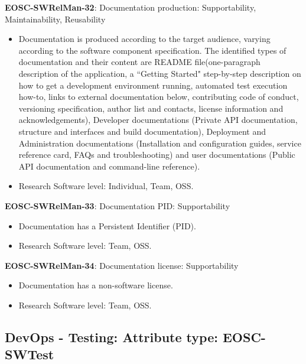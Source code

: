 \textbf{EOSC-SWRelMan-32}: Documentation production: Supportability, Maintainability, Reusability

\begin{itemize}
    \item Documentation is produced according to the target audience, varying according to the software component specification. The identified types of documentation and their content are README file(one-paragraph description of the application, a ``Getting Started" step-by-step description on how to get a development environment running, automated test execution how-to, links to external documentation below, contributing code of conduct, versioning specification, author list and contacts, license information and acknowledgements), Developer documentations (Private API documentation, structure and interfaces and build documentation), Deployment and Administration documentations (Installation and configuration guides, service reference card, FAQs and troubleshooting) and user documentations (Public API documentation and command-line reference).~\cite{aberdour_achieving_2007,shepherdson_cessda_2019,orviz_set_2017,orviz_fernandez_eosc-synergy_2020,raymond_software_2013}
    \item Research Software level: Individual, Team, OSS.
\end{itemize}

\textbf{EOSC-SWRelMan-33}: Documentation PID: Supportability

\begin{itemize}
    \item Documentation has a Persistent Identifier (PID).~\cite{orviz_fernandez_eosc-synergy_2020}
    \item Research Software level: Team, OSS.
\end{itemize}

\textbf{EOSC-SWRelMan-34}: Documentation license: Supportability

\begin{itemize}
    \item Documentation has a non-software license.~\cite{orviz_fernandez_eosc-synergy_2020}
    \item Research Software level: Team, OSS.
\end{itemize}

\subsection{DevOps - Testing: Attribute type: EOSC-SWTest}

